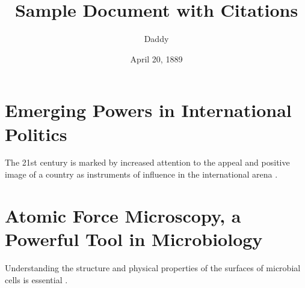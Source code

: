 \documentclass[a4paper]{article}
\title{\textbf{Sample Document with Citations}}
\author{Daddy}
\date{April 20, 1889}
\begin{document}
    \maketitle
    
    \section{Emerging Powers in International Politics}
    The 21st century is marked by increased attention to the appeal and positive image of a country as instruments of influence in the international arena \cite{bohomolov2012ghost}.

    \section{Atomic Force Microscopy, a Powerful Tool in Microbiology}
    Understanding the structure and physical properties of the surfaces of microbial cells is essential \cite{dufrene2002atomic}.
    
    
    
\end{document}
